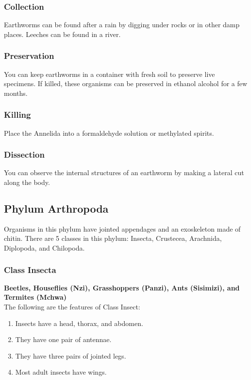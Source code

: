 \subsubsection{Collection}
Earthworms can be found after a rain by digging under rocks or in other damp places. Leeches can be found in a river.

\subsubsection{Preservation} 
You can keep earthworms in a container with fresh soil to preserve live specimens. If killed, these organisms can be preserved in ethanol alcohol for a few months. 

\subsubsection{Killing}
Place the Annelida into a formaldehyde solution or methylated spirits.

\subsubsection{Dissection}
You can observe the internal structures of an earthworm by making a lateral cut along the body.

\subsection{Phylum Arthropoda}
Organisms in this phylum have jointed appendages and an exoskeleton made of chitin. There are 5 classes in this phylum: Insecta, Crustecea, Arachnida, Diplopoda, and Chilopoda.

\subsubsection{Class Insecta}
\textbf{Beetles, Houseflies (Nzi), Grasshoppers (Panzi), Ants (Sisimizi), and Termites (Mchwa)}\\
The following are the features of Class Insect:
\begin{enumerate}
\item{Insects have a head, thorax, and abdomen.}
\item{They have one pair of antennae.}
\item{They have three pairs of jointed legs.}
\item{Most adult insects have wings.}
\end{enumerate}

